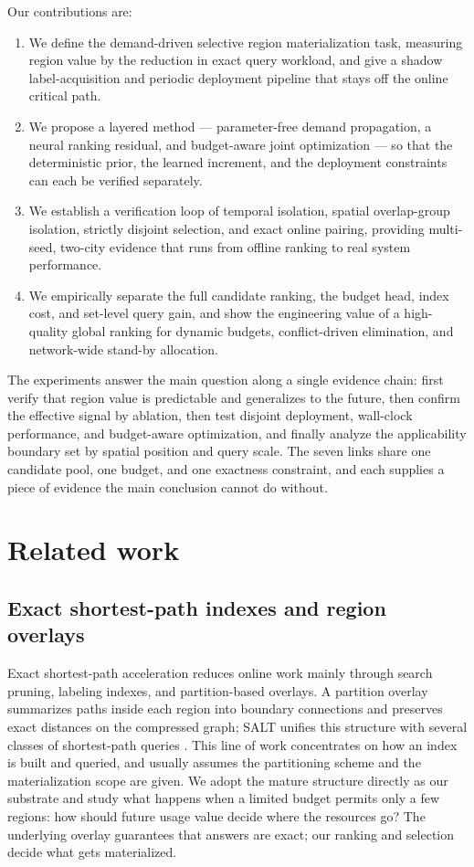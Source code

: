 \documentclass[5p,twocolumn,authoryear]{elsarticle}
\begin{document}
Our contributions are:

\begin{enumerate}
  \item We define the demand-driven selective region materialization task, measuring
  region value by the reduction in exact query workload, and give a shadow
  label-acquisition and periodic deployment pipeline that stays off the online critical
  path.
  \item We propose a layered method --- parameter-free demand propagation, a neural
  ranking residual, and budget-aware joint optimization --- so that the deterministic
  prior, the learned increment, and the deployment constraints can each be verified
  separately.
  \item We establish a verification loop of temporal isolation, spatial overlap-group
  isolation, strictly disjoint selection, and exact online pairing, providing
  multi-seed, two-city evidence that runs from offline ranking to real system
  performance.
  \item We empirically separate the full candidate ranking, the budget head, index
  cost, and set-level query gain, and show the engineering value of a high-quality
  global ranking for dynamic budgets, conflict-driven elimination, and network-wide
  stand-by allocation.
\end{enumerate}

The experiments answer the main question along a single evidence chain: first verify
that region value is predictable and generalizes to the future, then confirm the
effective signal by ablation, then test disjoint deployment, wall-clock performance,
and budget-aware optimization, and finally analyze the applicability boundary set by
spatial position and query scale. The seven links share one candidate pool, one
budget, and one exactness constraint, and each supplies a piece of evidence the main
conclusion cannot do without.

\section{Related work}

\subsection{Exact shortest-path indexes and region overlays}

Exact shortest-path acceleration reduces online work mainly through search pruning,
labeling indexes, and partition-based overlays. A partition overlay summarizes paths
inside each region into boundary connections and preserves exact distances on the
compressed graph; SALT unifies this structure with several classes of shortest-path
queries \citep{salt2014}. This line of work concentrates on how an index is built and
queried, and usually assumes the partitioning scheme and the materialization scope are
given. We adopt the mature structure directly as our substrate and study what happens
when a limited budget permits only a few regions: how should future usage value decide
where the resources go? The underlying overlay guarantees that answers are exact; our
ranking and selection decide what gets materialized.
\end{document}
